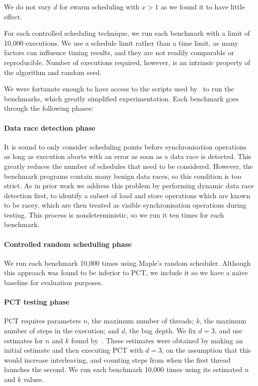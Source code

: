 We do not vary $d$ for swarm scheduling with $x > 1$ as we found it to have
little effect.

For each controlled scheduling technique, we run each benchmark with a limit of
10,000 executions.  We use a schedule limit rather than a time limit, as many
factors can influence timing results, and they are not readily comparable or
reproducible.  Number of executions required, however, is an intrinsic property
of the algorithm and random seed.

We were fortunate enough to have access to the scripts used
by~\cite{thomson2016,thomson2014} to run the benchmarks, which greatly
simplified experimentation.  Each benchmark goes through the following phases:

\paragraph{Data race detection phase}
It is sound to only consider scheduling points before synchronisation operations
as long as execution aborts with an error as soon as a data race is
detected\cite{musuvathi2008}.  This greatly reduces the number of schedules that
need to be considered.  However, the benchmark programs contain many benign data
races\cite{thomson2016}, so this condition is too strict.  As in prior
work\cite{thomson2016,thomson2014,yu2012} we address this problem by performing
dynamic data race detection first, to identify a subset of load and store
operations which are known to be racey, which are then treated as visible
synchronisation operations during testing.  This process is nondeterministic, so
we run it ten times for each benchmark.

\paragraph{Controlled random scheduling phase}
We run each benchmark 10,000 times using Maple's random scheduler.  Although
this approach was found to be inferior to PCT\cite{thomson2016}, we include it
so we have a na\"{\i}ve baseline for evaluation purposes.

\paragraph{PCT testing phase}
PCT requires parameters $n$, the maximum number of threads; $k$, the maximum
number of steps in the execution; and $d$, the bug depth.  We fix $d=3$, and use
estimates for $n$ and $k$ found by~\cite{thomson2016}.  These estimates were
obtained by making an initial estimate and then executing PCT with $d=3$, on the
assumption that this would increase interleaving, and counting steps from when
the first thread launches the second.  We run each benchmark 10,000 times using
its estimated $n$ and $k$ values.

